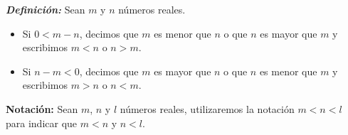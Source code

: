 \documentclass[11pt]{article}
\newcommand{\R}{\mathbb{R}}
\newcommand{\bfit}[1]{\textbf{\textit{#1}}}
\begin{document}
\bfit{Definición:}  Sean $m$ y $n$ números reales.\begin{itemize}
    \item Si $0<m-n$, decimos que $m$ es menor que $n$ o que $n$ es mayor que $m$ y escribimos $m<n$ o $n>m$.
    \item Si $n-m<0$, decimos que $m$ es mayor que $n$ o que $n$ es menor que $m$ y escribimos $m>n$ o $n<m$.
\end{itemize}
%
%
\textbf{Notación:} Sean $m$, $n$ y $l$ números reales, utilizaremos la notación $m<n<l$ para indicar que $m<n$ y $n<l$.
\end{document}
